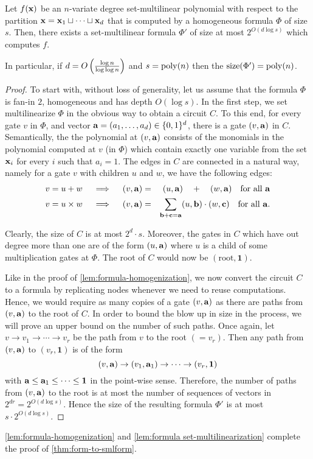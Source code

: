 \begin{lemma}\label{lem:formula set-multilinearization}
  Let $f(\mathbf{x})$ be an $n$-variate degree set-multilinear polynomial with respect to the partition $\mathbf{x} = \mathbf{x}_1\sqcup \cdots \sqcup \mathbf{x}_d$ that is computed by a homogeneous formula $\Phi$ of size $s$.
Then, there exists a set-multilinear formula $\Phi'$ of size at most $2^{O(d\log s)}$ which computes $f$.

In particular, if $d = O\left(\frac{\log n}{\log \log n}\right)$ and $s = \operatorname{poly}(n)$ then the $\mathrm{size}(\Phi') = \operatorname{poly}(n)$.  
\end{lemma}
\begin{proof}
To start with, without loss of generality, let us assume that the formula $\Phi$ is fan-in $2$, homogeneous and has depth $O(\log s)$.
In the first step, we set multilinearize $\Phi$ in the obvious way to obtain a circuit $C$.
To this end, for every gate $v$ in $\Phi$, and vector $\mathbf{a} = (a_1,\ldots, a_d) \in \{0,1\}^d$, there is a gate $(v, \mathbf{a})$ in $C$.
Semantically, the the polynomial at $(v,\mathbf{a})$ consists of the monomials in the polynomial computed at $v$ (in $\Phi$) which contain exactly one variable from the set $\mathbf{x}_i$ for every $i$ such that $a_i = 1$.
The edges in $C$ are connected in a natural way, namely for a gate $v$ with children $u$ and $w$, we have the following edges:
\begin{eqnarray*}
\text{$v = u + w$}\quad\implies\quad (v, \mathbf{a}) &=& (u, \mathbf{a}) \quad + \quad (w, \mathbf{a})\quad\text{for all $\mathbf{a}$}\\
\text{$v = u \times w$}\quad\implies\quad (v, \mathbf{a}) &=& \sum_{\mathbf{b} + \mathbf{c} = \mathbf{a}} (u, \mathbf{b})\cdot (w, \mathbf{c}) \quad\text{for all $\mathbf{a}$}.
\end{eqnarray*}
 
Clearly, the size of $C$ is at most $2^d\cdot s$.
Moreover, the gates in $C$ which have out degree more than one are of the form $(u,\mathbf{a})$ where $u$ is a child of some multiplication gates at $\Phi$. 
The root of $C$ would now be $(\text{root},\mathbf{1})$. 

Like in the proof of \autoref{lem:formula-homogenization}, we now convert the circuit $C$ to a formula by replicating nodes whenever we need to reuse computations.
Hence, we would require as many copies of a gate $(v, \mathbf{a})$ as there are paths from $(v,\mathbf{a})$ to the root of $C$.
In order to bound the blow up in size in the process, we will prove an upper bound on the number of such paths.
Once again, let $v \rightarrow v_1 \rightarrow \cdots \rightarrow v_r$ be the path from $v$ to the root $(=v_r)$.
Then any path from $(v,\mathbf{a})$ to $(v_r,\mathbf{1})$ is of the form
\[
(v,\mathbf{a}) \rightarrow (v_1,\mathbf{a}_1) \rightarrow \cdots \rightarrow (v_r,\mathbf{1})
\]
with $\mathbf{a} \leq \mathbf{a}_1 \leq \cdots \leq \mathbf{1}$ in the point-wise sense.
Therefore, the number of paths from $(v,\mathbf{a})$ to the root is at most the number of sequences of vectors in $2^{dr} = 2^{O(d\log s)}$.
Hence the size of the resulting formula $\Phi'$ is at most $s \cdot 2^{O(d \log s)}$. 
\end{proof}

\autoref{lem:formula-homogenization} and \autoref{lem:formula set-multilinearization} complete the proof of \autoref{thm:form-to-smlform}. 




